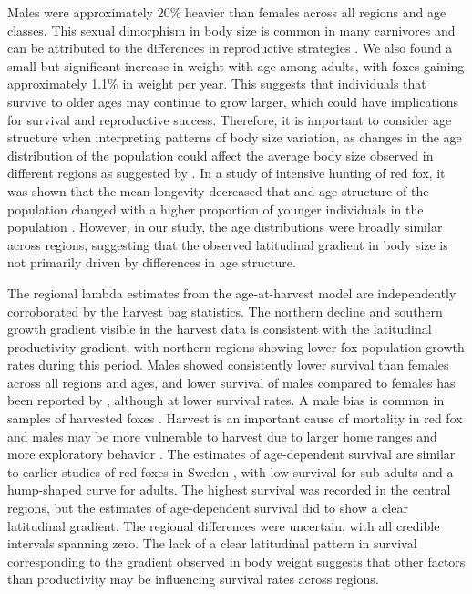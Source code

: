 \documentclass[12pt,a4paper,final,abstract=true,headings=small]{scrartcl}
\begin{document}
Males were approximately 20\% heavier than females across all regions and age classes. This sexual dimorphism in body size is common in many carnivores and can be attributed to the differences in reproductive strategies \citep{gittlemanCarnivoreBodySize1985, moorsSexualDimorphismBody1980}. We also found a small but significant increase in weight with age among adults, with foxes gaining approximately 1.1\% in weight per year. This suggests that individuals that survive to older ages may continue to grow larger, which could have implications for survival and reproductive success. Therefore, it is important to consider age structure when interpreting patterns of body size variation, as changes in the age distribution of the population could affect the average body size observed in different regions as suggested by \citet{theriotAccountingAgeUncovering2024a}. In a study of intensive hunting of red fox, it was shown that the mean longevity decreased that and age structure of the population changed with a higher proportion of younger individuals in the population \citep{yonedaEffectsHuntingAge1982}. However, in our study, the age distributions were broadly similar across regions, suggesting that the observed latitudinal gradient in body size is not primarily driven by differences in age structure.

The regional lambda estimates from the age-at-harvest model are independently corroborated by the harvest bag statistics. The northern decline and southern growth gradient visible in the harvest data is consistent with the latitudinal productivity gradient, with northern regions showing lower fox population growth rates during this period. Males showed consistently lower survival than females across all regions and ages, and lower survival of males compared to females has been reported by \citet{heydonDemographyRuralFoxes2000}, although at lower survival rates. A male bias is common in samples of harvested foxes \citep{englundAspectsReproductionMortality1970,yonedaEffectsHuntingAge1982}. Harvest is an important cause of mortality in red fox and males may be more vulnerable to harvest due to larger home ranges and more exploratory behavior \citep{heydonDemographyRuralFoxes2000}. The estimates of age-dependent survival are similar to earlier studies of red foxes in Sweden \citep{devenish-nelsonDemographyCarnivoreRed2013, willebrandDecliningSurvivalRates2022}, with low survival for sub-adults and a hump-shaped curve for adults. The highest survival was recorded in the central regions, but the estimates of age-dependent survival did to show a clear latitudinal gradient. The regional differences were uncertain, with all credible intervals spanning zero. The lack of a clear latitudinal pattern in survival corresponding to the gradient observed in body weight suggests that other factors than productivity may be influencing survival rates across regions.
\end{document}
